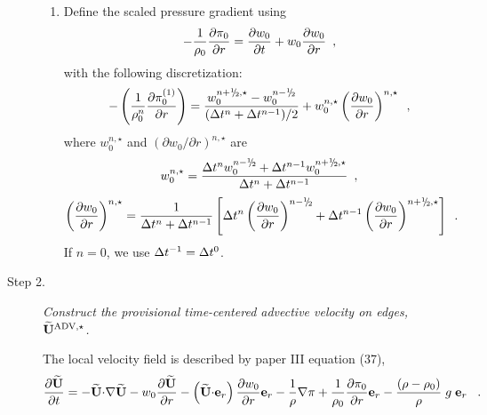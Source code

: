 \begin{description}
\begin{enumerate}
\item Define the scaled pressure gradient using
\begin{equation}
- \frac{1}{\rho_0} \frac{\partial \pi_0}{\partial r} 
= \frac{\partial w_0}{\partial t} + w_0 \frac{\partial w_0}{\partial r} 
\enskip, \label{eq:pizero}
\end{equation}
with the following discretization:
\begin{equation}
-\left ( \frac{1}{\rho_0^n} \frac{\partial \pizeroone}{\partial r} \right ) = 
\frac{w_0^{\nph,\star} - w_0^\nmh}{(\dt^n+\dt^{n-1})/2} 
+  w_0^{n,\star} \left(\frac{\partial w_0}{\partial r}\right)^{n,\star} \enskip ,
\end{equation} 
where $w_0^{n,\star}$ and $(\partial w_0 / \partial r)^{n,\star}$ are
\begin{equation}
w_0^{n,\star} = \frac{\dt^{n} w_0^{\nmh} + \dt^{n-1} w_0^{\nph,\star}}{\dt^n+\dt^{n-1}} 
\enskip,\end{equation}
\begin{equation}
\left(\frac{\partial w_0}{\partial r}\right)^{n,\star} = 
\frac{1}{\dt^n+\dt^{n-1} } 
\left [ \dt^{n} \left(\frac{\partial w_0 }{ \partial r}\right)^{\nmh}
+ \dt^{n-1} \left(\frac{\partial w_0 }{ \partial r}\right)^{\nph,\star} \right ] 
\enskip.\end{equation}
If $n=0$, we use $\Delta t^{-1} = \Delta t^0$.

\end{enumerate}

\item[Step 2.] {\em Construct the provisional time-centered advective velocity on 
edges, $\widetilde{\mathbf{U}}^{\mathrm{ADV},\star}$.}

The local velocity field is described by paper III equation (37),
\begin{equation}
\frac{\partial\widetilde{{\bf U}}}{\partial t} = - \widetilde{{\bf U}} \mathbf{\cdot} \mathbf{\nabla} \widetilde{{\bf U}} - w_0 \frac{\partial \widetilde{{\bf U}}}{\partial r}
                                 - \left(\widetilde{{\bf U}} \mathbf{\cdot} \mathbf{e}_r\right) \frac{\partial w_0}{\partial r} \mathbf{e}_r
                                 - \frac{1}{\rho} \mathbf{\nabla}\pi
                                 + \frac{1}{\rho_0} \frac{\partial \pi_0}{\partial r} \mathbf{e}_r
                                 - \frac{(\rho-\rho_0)}{\rho} \; g \; \mathbf{e}_r  \label{eq:utildeupd}  \enskip\
 .
\end{equation}


\end{description}
